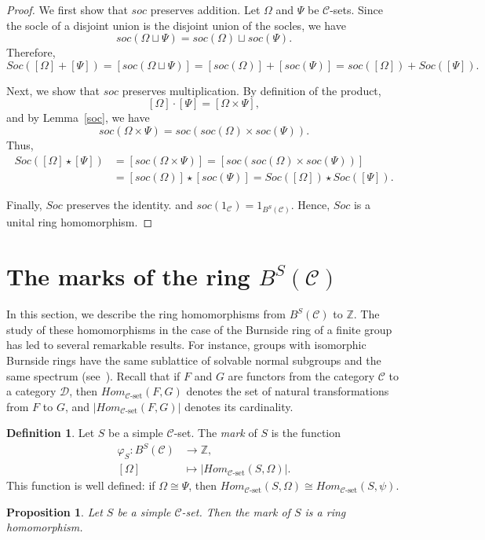 \documentclass[a4paper]{article}
\newtheorem{prop}[thm]{Proposition}
\theoremstyle{definition}
\newtheorem{defi}[thm]{Definition}
\theoremstyle{remark}
\newcommand*{\cat}[1]{\mathcal{#1}}
\begin{document}
\begin{proof}
We first show that $soc$ preserves addition. Let $\Omega$ and $\Psi$ be $\cat{C}$-sets. Since the socle of a disjoint union is the disjoint union of the socles, we have
\[
   soc(\Omega \sqcup \Psi) =soc(\Omega) \sqcup soc(\Psi).
\]
Therefore,
\[
   Soc([\Omega] + [\Psi]) = [soc(\Omega \sqcup \Psi)] = [soc(\Omega)] + [soc(\Psi)]=soc([\Omega]) + Soc([\Psi]). 
\]

Next, we show that $soc$ preserves multiplication. By definition of the product,
\[
    [\Omega] \cdot [\Psi] = [\Omega \times \Psi],
\]
and by Lemma~\ref{soc}, we have
\[
   soc(\Omega \times \Psi) =soc(soc(\Omega) \times soc(\Psi)).
\]
Thus,
\begin{align*}
     Soc([\Omega] \star [\Psi]) &= [soc(\Omega \times \Psi)]
    = [soc(soc(\Omega) \times soc(\Psi))]\\&
    = [soc(\Omega)] \star [soc(\Psi)]=Soc([\Omega] )\star Soc([\Psi]).
\end{align*}


Finally, $Soc$ preserves the identity. and $soc(1_{\cat{C}})= 1_{B^S(\cat{C})}$.  Hence,  $Soc$ is a unital ring homomorphism.
\end{proof}



\section{The marks of the ring $B^S(\cat{C})$}\label{marks}
In this section, we describe the ring homomorphisms from $B^S(\cat{C})$ to $\mathbb{Z}$. The study of these homomorphisms in the case of the Burnside ring of a finite group has led to several remarkable results. For instance, groups with isomorphic Burnside rings have the same sublattice of solvable normal subgroups and the same spectrum (see~\cite{irreducible}). Recall that if $F$ and $G$ are functors from the category $\cat{C}$ to a category $\cat{D}$, then $Hom_{\cat{C}\text{-set}}(F,G)$ denotes the set of natural transformations from $F$ to $G$, and $|Hom_{\cat{C}\text{-set}}(F,G)|$ denotes its cardinality.

\begin{defi}
Let $S$ be a simple $\cat{C}$-set. The \emph{mark} of $S$ is the function
\begin{align*}
    \varphi_S \colon B^S(\cat{C}) &\longrightarrow \mathbb{Z},\\
    [\Omega] &\longmapsto |Hom_{\cat{C}\text{-set}}(S,\Omega)|.
\end{align*}
This function is well defined: if $\Omega \cong \Psi$, then $Hom_{\cat{C}\text{-set}}(S,\Omega) \cong Hom_{\cat{C}\text{-set}}(S,\psi)$.
\end{defi}
\begin{prop}
Let $S$ be a simple $\cat{C}$-set. Then the mark of $S$ is a ring homomorphism.
\end{prop}
\end{document}
